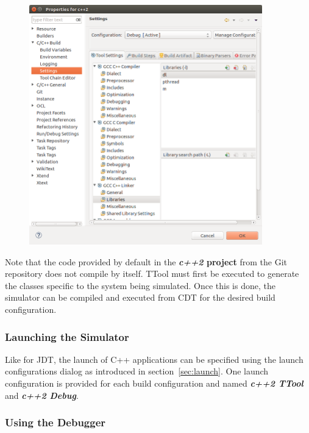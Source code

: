 \documentclass[12pt]{article}
\begin{document}
\begin{figure}[H]
\begin{center}
\includegraphics[width=0.9\textwidth]{images/image13.png}
\end{center}
\caption{}
\label{fig:image12}
\end{figure}

Note that the code provided by default in the \textbf{\textit{c++2} project}
from the Git repository does not compile by itself. TTool must first be executed
to generate the classes specific to the system being simulated. Once this is
done, the simulator can be compiled and executed from CDT for the desired build
configuration.

\subsubsection{Launching the Simulator}

Like for JDT, the launch of C++ applications can be specified using the launch
configurations dialog as introduced in section~\ref{sec:launch}. One launch
configuration is provided for each build configuration and named
\textbf{\textit{c++2 TTool}} and \textbf{\textit{c++2 Debug}}.

\subsubsection{Using the Debugger}
\end{document}
